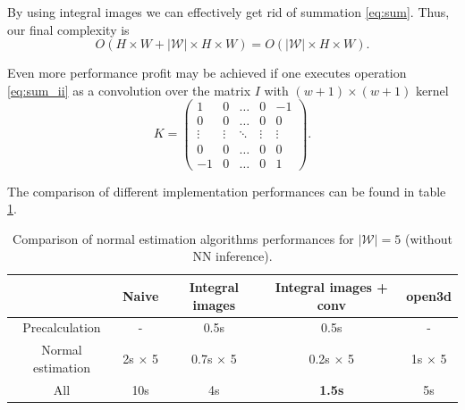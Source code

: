 By using integral images we can effectively get rid of summation \ref{eq:sum}. Thus, our final complexity is
\[
O\left(H \times W + \left|\mathcal{W}\right| \times H \times W \right) = O\left(\left|\mathcal{W}\right| \times H \times W \right).
\]

Even more performance profit may be achieved if one executes operation \ref{eq:sum_ii} as a convolution over the matrix $I$ with $(w + 1) \times (w + 1)$ kernel 
\[
K = 
\begin{pmatrix}
1 & 0 & \dots & 0 & -1 \\
0 & 0 & \dots & 0 & 0 \\
\vdots & \vdots & \ddots & \vdots & \vdots \\
0 & 0 & \dots & 0 & 0 \\
-1 & 0 & \dots & 0 & 1
\end{pmatrix}.
\]

The comparison of different implementation performances can be found in table \ref{table:perf}.

\begin{table}
\centering
\begin{tabular}{ | c | c | c | c | c | }
 \hline
 & Naive & Integral images & Integral images + conv & open3d \cite{open3d} \\ 
 \hline
 Precalculation & - & 0.5s & 0.5s  & - \\  
 \hline
 Normal estimation & 2s $\times$ 5  & 0.7s $\times$ 5  & 0.2s $\times$ 5 & 1s $\times$ 5 \\  
 \hline
 All & 10s & 4s  & \textbf{1.5s}  & 5s \\
 \hline
\end{tabular}
\caption{Comparison of normal estimation algorithms performances for $\left|\mathcal{W}\right| = 5$ (without NN inference).}
\label{table:perf}
\end{table}